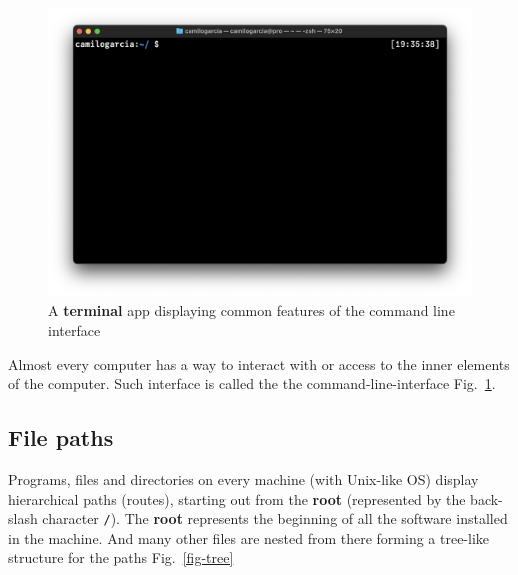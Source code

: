 \documentclass[
  letterpaper,
  DIV=11,
  numbers=noendperiod,
  oneside]{scrreprt}
\begin{document}
\begin{figure}

{\centering \includegraphics{chs-command-line/imgs-cli/terminal.png}

}

\caption{\label{fig-terminal}A \textbf{terminal} app displaying common
features of the command line interface}

\end{figure}

Almost every computer has a way to interact with or access to the inner
elements of the computer. Such interface is called the the
command-line-interface Fig.~\ref{fig-terminal}.

\hypertarget{file-paths}{%
\subsection{File paths}\label{file-paths}}

Programs, files and directories on every machine (with Unix-like OS)
display hierarchical paths (routes), starting out from the \textbf{root}
(represented by the back-slash character \texttt{/}). The \textbf{root}
represents the beginning of all the software installed in the machine.
And many other files are nested from there forming a tree-like structure
for the paths Fig.~\ref{fig-tree}
\end{document}

